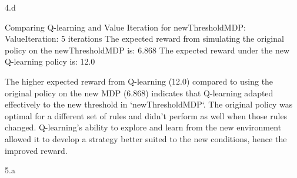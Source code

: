 \LARGE
4.d
\normalsize

\begin{answer}
  Comparing Q-learning and Value Iteration for newThresholdMDP:
  ValueIteration: 5 iterations
  The expected reward from simulating the original policy on the newThresholdMDP is: 6.868
  The expected reward under the new Q-learning policy is: 12.0

  The higher expected reward from Q-learning (12.0) compared to using the original policy on the new MDP (6.868) indicates that Q-learning adapted effectively to the new threshold in `newThresholdMDP`. The original policy was optimal for a different set of rules and didn't perform as well when those rules changed. Q-learning's ability to explore and learn from the new environment allowed it to develop a strategy better suited to the new conditions, hence the improved reward.
\end{answer}
\clearpage

\LARGE
5.a
\normalsize


